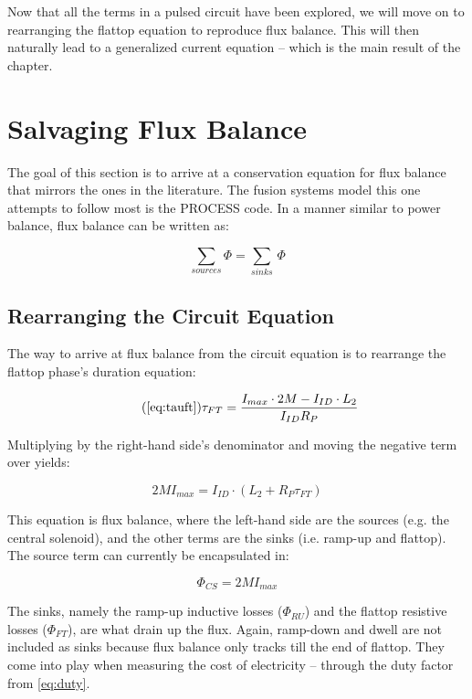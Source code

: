 Now that all the terms in a pulsed circuit have been explored, we will move on to rearranging the flattop equation to reproduce flux balance. This will then naturally lead to a generalized current equation -- which is the main result of the chapter.

\section{Salvaging Flux Balance}

The goal of this section is to arrive at a conservation equation for flux balance that mirrors the ones in the literature. The fusion systems model this one attempts to follow most is the PROCESS code.\cite{process} In a manner similar to power balance, flux balance can be written as:

\begin{equation}
	\sum_{sources} \Phi = \sum_{sinks} \, \Phi
\end{equation}

\subsection{Rearranging the Circuit Equation}

The way to arrive at flux balance from the circuit equation is to rearrange the flattop phase's duration equation:

\begin{equation}
	\tag{\ref{eq:tauft}}
	\tau_{FT} = \frac{ I_{max} \cdot 2 M - I_{ID} \cdot  L_2 }{I_{ID} R_P}
\end{equation}

Multiplying by the right-hand side's denominator and moving the negative term over yields:

\begin{equation}
	2 M I_{max} = I_{ID} \cdot \left( L_2 + R_P \tau_{FT} \right) 
\end{equation}

This equation is flux balance, where the left-hand side are the sources (e.g. the central solenoid), and the other terms are the sinks (i.e. ramp-up and flattop). The source term can currently be encapsulated in:

\begin{equation}
	\label{eq:phics}
	\Phi_{CS} = 2 M I_{max}
\end{equation}

The sinks, namely the ramp-up inductive losses ($\Phi_{RU}$) and the flattop resistive losses ($\Phi_{FT}$), are what drain up the flux. Again, ramp-down and dwell are not included as sinks because flux balance only tracks till the end of flattop. They come into play when measuring the cost of electricity -- through the duty factor from \cref{eq:duty}.

